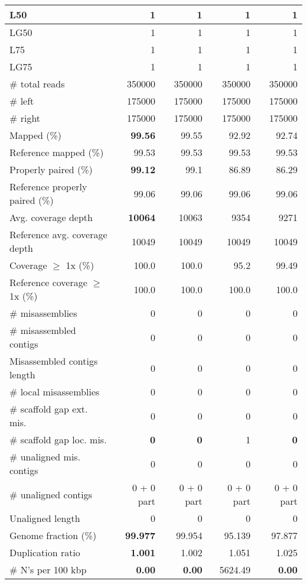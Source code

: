\documentclass[12pt,a4paper]{article}
\begin{document}
\begin{table}[ht]
\begin{center}
\begin{tabular}{|l*{4}{|r}|}
L50 & 1 & 1 & 1 & 1 \\ \hline
LG50 & 1 & 1 & 1 & 1 \\ \hline
L75 & 1 & 1 & 1 & 1 \\ \hline
LG75 & 1 & 1 & 1 & 1 \\ \hline
\# total reads & 350000 & 350000 & 350000 & 350000 \\ \hline
\# left & 175000 & 175000 & 175000 & 175000 \\ \hline
\# right & 175000 & 175000 & 175000 & 175000 \\ \hline
Mapped (\%) & {\bf 99.56} & 99.55 & 92.92 & 92.74 \\ \hline
Reference mapped (\%) & 99.53 & 99.53 & 99.53 & 99.53 \\ \hline
Properly paired (\%) & {\bf 99.12} & 99.1 & 86.89 & 86.29 \\ \hline
Reference properly paired (\%) & 99.06 & 99.06 & 99.06 & 99.06 \\ \hline
Avg. coverage depth & {\bf 10064} & 10063 & 9354 & 9271 \\ \hline
Reference avg. coverage depth & 10049 & 10049 & 10049 & 10049 \\ \hline
Coverage $\geq$ 1x (\%) & 100.0 & 100.0 & 95.2 & 99.49 \\ \hline
Reference coverage $\geq$ 1x (\%) & 100.0 & 100.0 & 100.0 & 100.0 \\ \hline
\# misassemblies & 0 & 0 & 0 & 0 \\ \hline
\# misassembled contigs & 0 & 0 & 0 & 0 \\ \hline
Misassembled contigs length & 0 & 0 & 0 & 0 \\ \hline
\# local misassemblies & 0 & 0 & 0 & 0 \\ \hline
\# scaffold gap ext. mis. & 0 & 0 & 0 & 0 \\ \hline
\# scaffold gap loc. mis. & {\bf 0} & {\bf 0} & 1 & {\bf 0} \\ \hline
\# unaligned mis. contigs & 0 & 0 & 0 & 0 \\ \hline
\# unaligned contigs & 0 + 0 part & 0 + 0 part & 0 + 0 part & 0 + 0 part \\ \hline
Unaligned length & 0 & 0 & 0 & 0 \\ \hline
Genome fraction (\%) & {\bf 99.977} & 99.954 & 95.139 & 97.877 \\ \hline
Duplication ratio & {\bf 1.001} & 1.002 & 1.051 & 1.025 \\ \hline
\# N's per 100 kbp & {\bf 0.00} & {\bf 0.00} & 5624.49 & {\bf 0.00} \\ \hline

\end{tabular}
\end{center}
\end{table}
\end{document}
